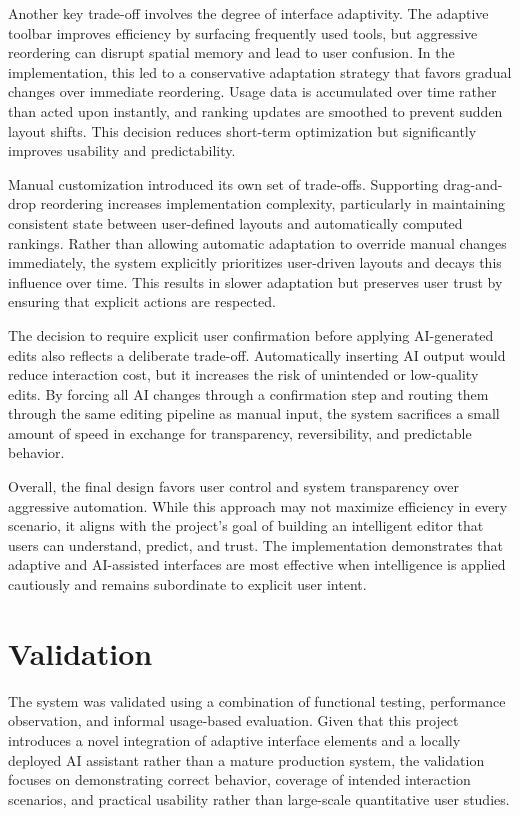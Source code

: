 \documentclass[sigconf]{acmart}
\begin{document}
Another key trade-off involves the degree of interface adaptivity. The adaptive toolbar improves efficiency by surfacing frequently used tools, but aggressive reordering can disrupt spatial memory and lead to user confusion. In the implementation, this led to a conservative adaptation strategy that favors gradual changes over immediate reordering. Usage data is accumulated over time rather than acted upon instantly, and ranking updates are smoothed to prevent sudden layout shifts. This decision reduces short-term optimization but significantly improves usability and predictability.

Manual customization introduced its own set of trade-offs. Supporting drag-and-drop reordering increases implementation complexity, particularly in maintaining consistent state between user-defined layouts and automatically computed rankings. Rather than allowing automatic adaptation to override manual changes immediately, the system explicitly prioritizes user-driven layouts and decays this influence over time. This results in slower adaptation but preserves user trust by ensuring that explicit actions are respected.

The decision to require explicit user confirmation before applying AI-generated edits also reflects a deliberate trade-off. Automatically inserting AI output would reduce interaction cost, but it increases the risk of unintended or low-quality edits. By forcing all AI changes through a confirmation step and routing them through the same editing pipeline as manual input, the system sacrifices a small amount of speed in exchange for transparency, reversibility, and predictable behavior.

Overall, the final design favors user control and system transparency over aggressive automation. While this approach may not maximize efficiency in every scenario, it aligns with the project’s goal of building an intelligent editor that users can understand, predict, and trust. The implementation demonstrates that adaptive and AI-assisted interfaces are most effective when intelligence is applied cautiously and remains subordinate to explicit user intent.

\section{Validation}

The system was validated using a combination of functional testing, performance observation, and informal usage-based evaluation. Given that this project introduces a novel integration of adaptive interface elements and a locally deployed AI assistant rather than a mature production system, the validation focuses on demonstrating correct behavior, coverage of intended interaction scenarios, and practical usability rather than large-scale quantitative user studies.
\end{document}
